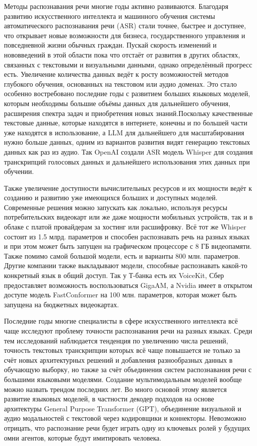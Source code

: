 Методы распознавания речи многие годы активно развиваются.
Благодаря развитию искусственного интеллекта и машинного обучения системы автоматического распознавания речи (ASR) стали точнее, быстрее и доступнее, что открывает новые возможности для бизнеса, государственного управления и повседневной жизни обычных граждан.
Пускай скорость изменений и нововведений в этой области пока что отстаёт от развития в других областях, связанных с текстовыми и визуальными данными, однако определённый прогресс есть.
Увеличение количества данных ведёт к росту возможностей методов глубокого обучения, основанных на текстовом или аудио доменах.
Это стало особенно востребовано последние годы с развитием больших языковых моделей, которым необходимы большие объёмы данных для дальнейшего обучения, расширения спектра задач и приобретения новых знаний.Поскольку качественные текстовые данные, которые находятся в интернете, конечны и по большей части уже находятся в использование, а LLM для дальнейшего для масштабирования нужно больше данных, одним из вариантов развития видят генерацию текстовых данных как раз из аудио.
Так OpenAI создали ASR модель Whisper для создания транскрипций голосовых данных и дальнейшего использования этих данных при обучении.

Также увеличение доступности вычислительных ресурсов и их мощности ведёт к созданию и развитию уже имеющихся больших и доступных моделей.
Современные решения можно запускать как локально, используя ресурсы потребительских видеокарт или же даже мощности мобильных устройств, так и в облаке с платой провайдерам за хостинг или расшифровку.
Всё тот же Whisper состоит из 1.5 млрд. параметров и способен распознавать речь на разных языках и при этом может быть запущен на графическом процессоре с 8 ГБ видеопамяти.
Также помимо самой большой модели, есть и варианты 800 млн. параметров.
Другие компании также выкладывают модели, способные распознавать какой-то конкретный язык в общий доступ.
Так у Т-банка есть их VoiceKit, Сбер предоставляет возможность воспользоваться GigaAM, а Nvidia имеет в открытом доступе модель FastConformer на 100 млн. параметров, которая может быть запущена на бюджетных видеокартах.

Последние годы многие специалисты в сфере искусственного интеллекта всё чаще исследуют проблему точности распознавания речи на разных языках.
Среди тем исследований наблюдается тенденция по увеличению числа решений, точность текстовых транскрипции которых всё чаще повышается не только за счёт новых архитектурных решений и добавления разнообразных данных в обучающую выборку, но также за счёт объединения систем распознавания речи с большими языковыми моделями.
Создание мультимодальным моделей вообще можно назвать трендом последних лет.
Во много основой этому является развитие языковых моделей, в частности декодер подходов на основе архитектуры General Purpose Transformer (GPT), объединение визуальной и аудио модальностей с текстовой через кодировщики и коннекторы.
Невозможно отрицать, что распознание речи будет играть одну из ключевых ролей у будущих омни агентов, которые будут имитировать человека.

